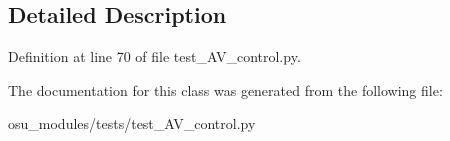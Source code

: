 \subsection{Detailed Description}


Definition at line 70 of file test\+\_\+\+A\+V\+\_\+control.\+py.



The documentation for this class was generated from the following file\+:\begin{DoxyCompactItemize}
\item 
osu\+\_\+modules/tests/test\+\_\+\+A\+V\+\_\+control.\+py\end{DoxyCompactItemize}
